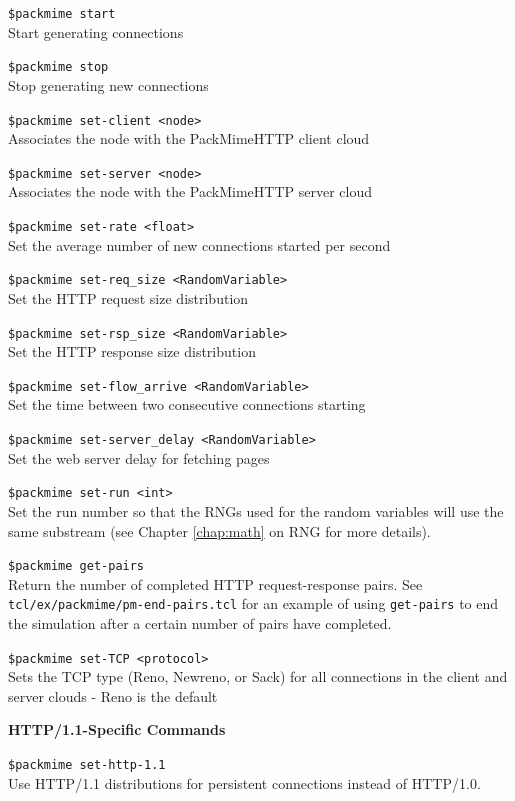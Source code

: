 {\tt \$packmime start}\\
Start generating connections

{\tt \$packmime stop}\\
Stop generating new connections

{\tt \$packmime set-client <node>}\\
Associates the node with the PackMimeHTTP client cloud 

{\tt \$packmime set-server <node>}\\
Associates the node with the PackMimeHTTP server cloud 

{\tt \$packmime set-rate <float>}\\
Set the average number of new connections started per second 

{\tt \$packmime set-req\_size <RandomVariable>}\\
Set the HTTP request size distribution 

{\tt \$packmime set-rsp\_size <RandomVariable>}\\
Set the HTTP response size distribution 

{\tt \$packmime set-flow\_arrive <RandomVariable>}\\
Set the time between two consecutive connections starting

{\tt \$packmime set-server\_delay <RandomVariable>}\\
Set the web server delay for fetching pages 

{\tt \$packmime set-run <int>}\\
Set the run number so that the RNGs used for the random variables will
use the same substream (see Chapter \ref{chap:math} on RNG for more details).

{\tt \$packmime get-pairs}\\
Return the number of completed HTTP request-response pairs.  See 
{\tt tcl/ex/packmime/pm-end-pairs.tcl} for an example of using
{\tt get-pairs} to end the simulation after a certain number of
pairs have completed.

{\tt \$packmime set-TCP <protocol>}\\
Sets the TCP type (Reno, Newreno, or Sack) for all connections in the
client and server clouds - Reno is the default

{\bf HTTP/1.1-Specific Commands}

{\tt \$packmime set-http-1.1}\\
Use HTTP/1.1 distributions for persistent connections instead of HTTP/1.0.

